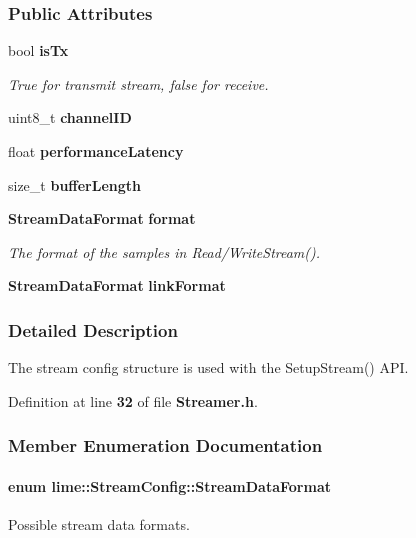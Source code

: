 \subsubsection*{Public Attributes}
\begin{DoxyCompactItemize}
\item 
bool {\bf is\+Tx}
\begin{DoxyCompactList}\small\item\em True for transmit stream, false for receive. \end{DoxyCompactList}\item 
uint8\+\_\+t {\bf channel\+ID}
\item 
float {\bf performance\+Latency}
\item 
size\+\_\+t {\bf buffer\+Length}
\item 
{\bf Stream\+Data\+Format} {\bf format}
\begin{DoxyCompactList}\small\item\em The format of the samples in Read/\+Write\+Stream(). \end{DoxyCompactList}\item 
{\bf Stream\+Data\+Format} {\bf link\+Format}
\end{DoxyCompactItemize}


\subsubsection{Detailed Description}
The stream config structure is used with the Setup\+Stream() A\+PI. 

Definition at line {\bf 32} of file {\bf Streamer.\+h}.



\subsubsection{Member Enumeration Documentation}
\paragraph[{Stream\+Data\+Format}]{\setlength{\rightskip}{0pt plus 5cm}enum {\bf lime\+::\+Stream\+Config\+::\+Stream\+Data\+Format}}\label{structlime_1_1StreamConfig_aeba178b2150eaa53f383c88befcd4bc9}


Possible stream data formats. 

